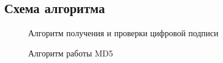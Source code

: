 
\subsection{Схема алгоритма}

\begin{figure}[h]
    \centering
    \def\svgwidth{0.6\textwidth}
    
    \caption{Алгоритм получения и проверки цифровой подписи}
\end{figure}

\begin{figure}[h]
    \centering
    \def\svgwidth{0.5\textwidth}
    
    \caption{Алгоритм работы MD5}
\end{figure}


